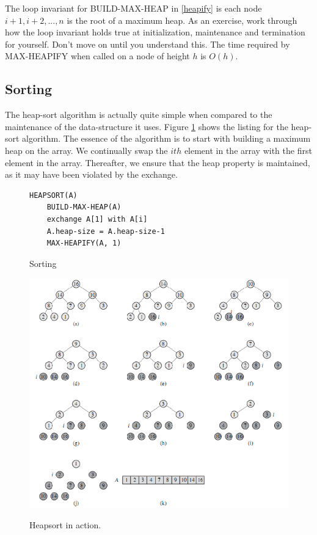\documentclass[10pt,a4paper]{article}
\begin{document}
The loop invariant for BUILD-MAX-HEAP in \ref{heapify} is each node $i+1, i+2,...,n$ is the root of a maximum heap. As an exercise, work through how the loop invariant holds true at initialization, maintenance and termination for yourself. Don't move on until you understand this. The time required by MAX-HEAPIFY when called on a node of height $h$ is $O(h)$. 
\subsection{Sorting}
The heap-sort algorithm is actually quite simple when compared to the maintenance of the data-structure it uses. Figure \ref{heapsort} shows the listing for the heap-sort algorithm. The essence of the algorithm is to start with building a maximum heap on the array. We continually swap the $ith$ element in the array with the first element in the array. Thereafter, we ensure that the heap property is maintained, as it may have been violated by the exchange. 
\begin{figure}
\caption{Sorting}
\begin{center}
\begin{lstlisting}
HEAPSORT(A)
	BUILD-MAX-HEAP(A)
	exchange A[1] with A[i]
	A.heap-size = A.heap-size-1
	MAX-HEAPIFY(A, 1) 
\end{lstlisting}
\label{heapsort}
\end{center}
\end{figure}

\begin{figure}
\caption{Heapsort in action.\cite{INTROALG}}
\begin{center}
\includegraphics[scale=0.43]{../images/heapsort.png}
\label{heap}
\end{center}
\end{figure}
\end{document}
